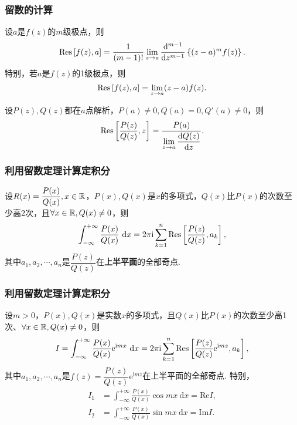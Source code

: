 \begin{frame}
    \frametitle{留数的计算}
    \footnotesize
    \begin{mytheorem}
        设$a$是$f(z)$的$m$级极点，则
        \begin{equation}
            \mathrm{Res}\left[f(z), a\right]=\frac1{(m-1)!}\lim_{z\to a}\frac{\mathrm d^{m-1}}{\mathrm dz^{m-1}}\left\{(z-a)^mf(z)\right\}. 
        \end{equation}
        特别，若$a$是$f(z)$的1级极点，则
        \begin{equation}
            \mathrm{Res}\left[f(z), a\right]=\lim_{z\to a}(z-a)f(z).
        \end{equation}
    \end{mytheorem}
    \begin{mycorollary}\label{cor:residue-P/Q}
        设$P(z),Q(z)$都在$a$点解析，$P(a)\neq0,Q(a)=0,Q'(a)\neq0$，则
        \begin{equation}
            \mathrm{Res}\left[\frac{P(z)}{Q(z)}, z\right]=\frac{P(a)}{\displaystyle\lim_{z\to a}\dfrac{\mathrm dQ(z)}{\mathrm dz}}. 
        \end{equation}
    \end{mycorollary}
\end{frame}

\begin{frame}
    \frametitle{利用留数定理计算定积分}
    \begin{myproposition}[有理函数广义积分]
        设$R(x)=\dfrac{P(x)}{Q(x)},x\in\mathbb{R}$，$P(x),Q(x)$是$x$的多项式，$Q(x)$比$P(x)$的次数至少高2次，且$\forall x\in\mathbb{R},Q(x)\neq 0$，则
        \begin{equation}
            \int_{-\infty}^{+\infty}\frac{P(x)}{Q(x)}\ \mathrm dx=2\pi\mathrm i\sum_{k=1}^n\Res{\frac{P(z)}{Q(z)}}{a_k},
        \end{equation}
        其中$a_1,a_2,\cdots,a_n$是$\dfrac{P(z)}{Q(z)}$在\textbf{上半平面}的全部奇点. 
    \end{myproposition}
\end{frame}

\begin{frame}
    \frametitle{利用留数定理计算定积分}
    \small
    \begin{myproposition}\label{prop:residue-P/Q-exp}
        设$m>0$，$P(x),Q(x)$是实数$x$的多项式，且$Q(x)$比$P(x)$的次数至少高1次、$\forall x\in\mathbb{R},Q(x)\neq 0$，则
        \begin{equation}
            I=\int_{-\infty}^{+\infty}\frac{P(x)}{Q(x)}\mathrm e^{\mathrm imx}\ \mathrm dx=2\pi\mathrm i\sum_{k=1}^n\mathrm{Res}\left[\frac{P(z)}{Q(z)}\mathrm e^{\mathrm imz}, a_k\right],
        \end{equation}
        其中$a_1,a_2,\cdots,a_n$是$f(z)=\dfrac{P(z)}{Q(z)}\mathrm e^{\mathrm imz}$在上半平面的全部奇点. 
        特别，
        \begin{align}
            I_1&=\int_{-\infty}^{+\infty}\frac{P(x)}{Q(x)}\cos mx\ \mathrm dx=\mathrm{Re} I,\\
            I_2&=\int_{-\infty}^{+\infty}\frac{P(x)}{Q(x)}\sin mx\ \mathrm dx=\mathrm{Im} I.
        \end{align}        
    \end{myproposition}
\end{frame}